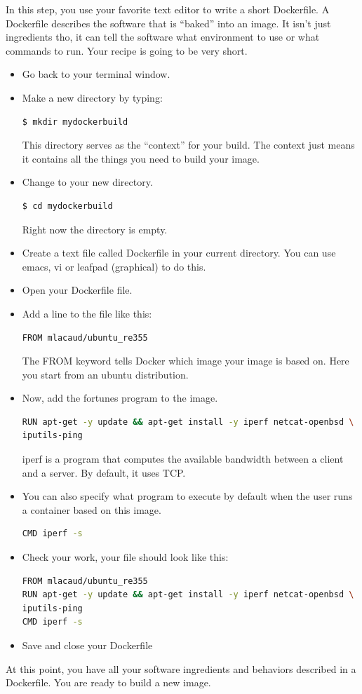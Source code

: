 \documentclass[a4paper,11pt]{exam}
\begin{document}
In this step, you use your favorite text editor to write a short Dockerfile. A Dockerfile describes the software that is “baked” into an image. It isn’t just ingredients tho, it can tell the software what environment to use or what commands to run. Your recipe is going to be very short.
\begin{itemize}
	\item Go back to your terminal window.
	\item Make a new directory by typing:
	\begin{lstlisting}[frame=single,language={sh}]
$ mkdir mydockerbuild
	\end{lstlisting}
	This directory serves as the “context” for your build. The context just means it contains all the things you need to build your image.
	\item Change to your new directory.
	\begin{lstlisting}[frame=single,language={sh}]
$ cd mydockerbuild
	\end{lstlisting}
Right now the directory is empty.
	\item Create a text file called Dockerfile in your current directory. You can use emacs, vi or leafpad (graphical) to do this.
	\item Open your Dockerfile file.
	\item Add a line to the file like this:
		\begin{lstlisting}[frame=single,language={sh}]
FROM mlacaud/ubuntu_re355
	\end{lstlisting}
	The FROM keyword tells Docker which image your image is based on. Here you start from an ubuntu distribution.
	\item Now, add the fortunes program to the image.
	\begin{lstlisting}[frame=single,language={sh}]
RUN apt-get -y update && apt-get install -y iperf netcat-openbsd \
iputils-ping
	\end{lstlisting}	
iperf is a program that computes the available bandwidth between a client and a server. By default, it uses TCP.

	\item You can also specify what program to execute by default when the user runs a  container based on this image.
	
\begin{lstlisting}[frame=single,language={sh}]
CMD iperf -s
\end{lstlisting}	
	
	\item Check your work, your file should look like this:
	
\begin{lstlisting}[frame=single,language={sh}]
FROM mlacaud/ubuntu_re355
RUN apt-get -y update && apt-get install -y iperf netcat-openbsd \
iputils-ping
CMD iperf -s
\end{lstlisting}	
\item Save and close your Dockerfile
\end{itemize}
At this point, you have all your software ingredients and behaviors described in a Dockerfile. You are ready to build a new image.
\end{document}
